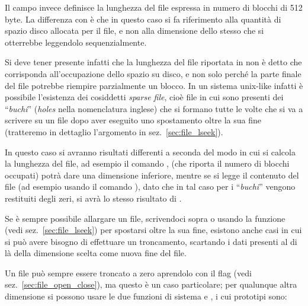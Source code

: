 Il campo  invece definisce la lunghezza del file espressa in
numero di blocchi di 512 byte. La differenza con  è che in
questo caso si fa riferimento alla quantità di spazio disco allocata per il
file, e non alla dimensione dello stesso che si otterrebbe leggendolo
sequenzialmente.

Si deve tener presente infatti che la lunghezza del file riportata in
 non è detto che corrisponda all'occupazione dello spazio su
disco, e non solo perché la parte finale del file potrebbe riempire
parzialmente un blocco. In un sistema unix-like infatti è possibile
l'esistenza dei cosiddetti \textit{sparse file}, cioè file in cui sono
presenti dei ``\textsl{buchi}'' (\textit{holes} nella nomenclatura inglese)
che si formano tutte le volte che si va a scrivere su un file dopo aver
eseguito uno spostamento oltre la sua fine (tratteremo in dettaglio
l'argomento in sez.~\ref{sec:file_lseek}).

In questo caso si avranno risultati differenti a seconda del modo in cui si
calcola la lunghezza del file, ad esempio il comando , (che riporta il
numero di blocchi occupati) potrà dare una dimensione inferiore, mentre se si
legge il contenuto del file (ad esempio usando il comando ), dato
che in tal caso per i ``\textsl{buchi}'' vengono restituiti degli zeri, si
avrà lo stesso risultato di .

Se è sempre possibile allargare un file, scrivendoci sopra o usando la
funzione  (vedi sez.~\ref{sec:file_lseek}) per spostarsi oltre la
sua fine, esistono anche casi in cui si può avere bisogno di effettuare un
troncamento, scartando i dati presenti al di là della dimensione scelta come
nuova fine del file.

Un file può sempre essere troncato a zero aprendolo con il flag
 (vedi sez.~\ref{sec:file_open_close}), ma questo è un caso
particolare; per qualunque altra dimensione si possono usare le due funzioni
di sistema  e , i cui prototipi sono:

